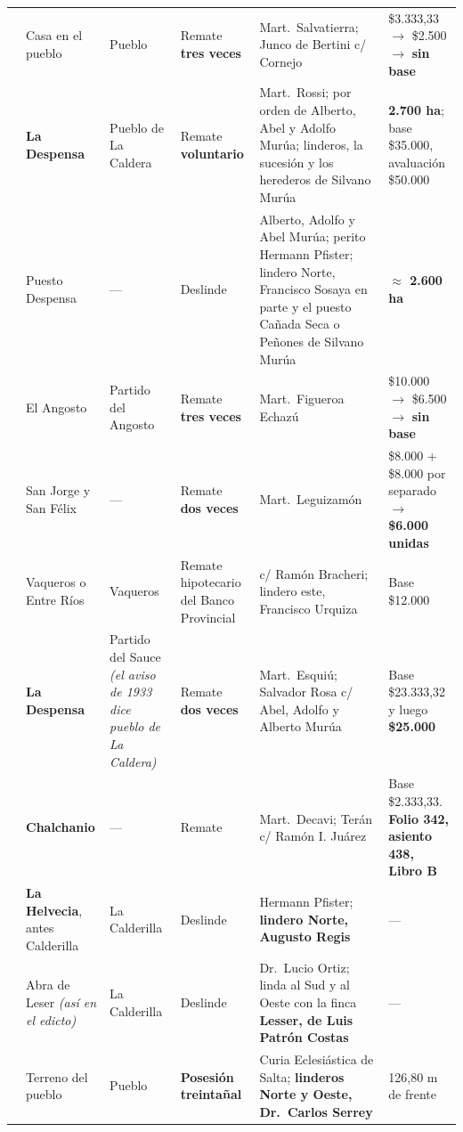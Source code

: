 {\begin{longtable}{@{}p{0.8cm}p{2.4cm}p{1.6cm}p{2.1cm}p{2.9cm}p{2.1cm}@{}}
\addlinespace
1932 & Casa en el pueblo & Pueblo & Remate \textbf{tres veces} & Mart.\ Salvatierra; Junco de Bertini c/ Cornejo & \$3.333,33 $\rightarrow$ \$2.500 $\rightarrow$ \textbf{sin base} \\
\addlinespace
1933 & \textbf{La Despensa} & Pueblo de La Caldera & Remate \textbf{voluntario} & Mart.\ Rossi; por orden de Alberto, Abel y Adolfo Murúa; linderos, la sucesión y los herederos de Silvano Murúa & \textbf{2.700 ha}; base \$35.000, avaluación \$50.000 \\
\addlinespace
1934 & Puesto Despensa & --- & Deslinde & Alberto, Adolfo y Abel Murúa; perito Hermann Pfister; lindero Norte, Francisco Sosaya en parte y el puesto Cañada Seca o Peñones de Silvano Murúa & \textbf{$\approx$ 2.600 ha} \\
\addlinespace
1934 & El Angosto & Partido del Angosto & Remate \textbf{tres veces} & Mart.\ Figueroa Echazú & \$10.000 $\rightarrow$ \$6.500 $\rightarrow$ \textbf{sin base} \\
\addlinespace
1934 & San Jorge y San Félix & --- & Remate \textbf{dos veces} & Mart.\ Leguizamón & \$8.000 + \$8.000 por separado $\rightarrow$ \textbf{\$6.000 unidas} \\
\addlinespace
1935 & Vaqueros o Entre Ríos & Vaqueros & Remate hipotecario del Banco Provincial & c/ Ramón Bracheri; lindero este, Francisco Urquiza\index{Urquiza, Francisco S.} & Base \$12.000 \\
\addlinespace
1936 & \textbf{La Despensa} & Partido del Sauce \textit{(el aviso de 1933 dice pueblo de La Caldera)} & Remate \textbf{dos veces} & Mart.\ Esquiú; Salvador Rosa c/ Abel, Adolfo y Alberto Murúa & Base \$23.333,32 y luego \textbf{\$25.000} \\
\addlinespace
1937 & \textbf{Chalchanio} & --- & Remate & Mart.\ Decavi; Terán c/ Ramón I. Juárez\index{Juárez, Ramón} & Base \$2.333,33. \textbf{Folio 342, asiento 438, Libro B} \\
\addlinespace
1937 & \textbf{La Helvecia}, antes Calderilla & La Calderilla & Deslinde & Hermann Pfister\index{Pfister, Hermann}; \textbf{lindero Norte, Augusto Regis}\index{Regis, Augusto} & --- \\
\addlinespace
1938 & Abra de Leser \textit{(así en el edicto)} & La Calderilla & Deslinde & Dr.\ Lucio Ortiz; linda al Sud y al Oeste con la finca \textbf{Lesser, de Luis Patrón Costas} & --- \\
\addlinespace
1939 & Terreno del pueblo & Pueblo & \textbf{Posesión treintañal} & Curia Eclesiástica de Salta; \textbf{linderos Norte y Oeste, Dr.\ Carlos Serrey}\index{Serrey, Carlos} & 126,80 m de frente \\

\end{longtable}}
